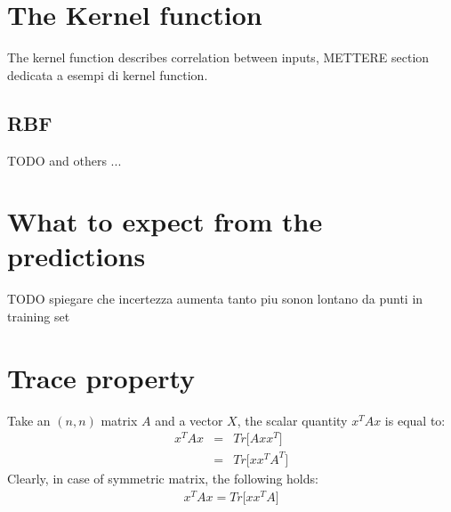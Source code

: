 \documentclass{article}
\begin{document}
\section{The Kernel function}

The kernel function describes correlation between inputs, METTERE section dedicata a esempi di kernel function.

\subsection{RBF}

TODO and others ...

\section{What to expect from the predictions}

TODO spiegare che incertezza aumenta tanto piu sonon lontano da punti in training set

\appendix
\section{Trace property}

Take an $(n,n)$ matrix $A$ and a vector $X$, the scalar quantity $x^T A x$ is equal to:
\begin{eqnarray}
x^T A x &=& Tr \bigg [ 
A xx^T
\bigg ] \\
&=& Tr \bigg [ 
xx^T A^T
\bigg ]
\label{eq:Tr_property}
\end{eqnarray}
Clearly, in case of symmetric matrix, the following holds:
\begin{eqnarray}
x^T A x = Tr \bigg [ 
xx^T A
\bigg ]
\end{eqnarray}
\end{document}
